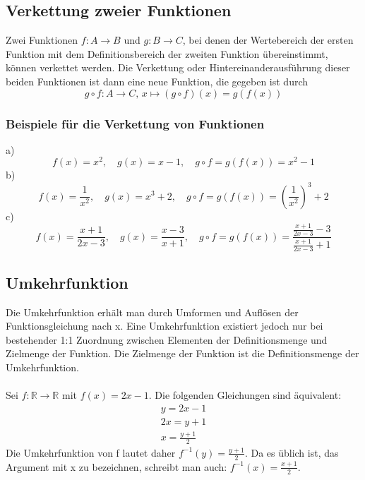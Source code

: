 \documentclass[a4paper]{article}
\begin{document}
\subsection{Verkettung zweier Funktionen}
Zwei Funktionen $f \colon A \to B$ und $g \colon B \to C$, bei denen der Wertebereich der ersten Funktion mit dem Definitionsbereich der zweiten Funktion übereinstimmt, können verkettet werden. Die Verkettung oder Hintereinanderausführung dieser beiden Funktionen ist dann eine neue Funktion, die gegeben ist durch
\[ g \circ f \colon A \to C, \, x \mapsto (g \circ f)(x) = g(f(x)) \]
\subsubsection{Beispiele für die Verkettung von Funktionen}
a)\[f(x)=x^2, \quad g(x)=x-1,\quad g\circ f=g(f(x))=x^2-1 \]
b)\[f(x)=\frac{1}{x^2}, \quad g(x)=x^3+2,\quad g\circ f=g(f(x))={\left(\frac{1}{x^2}\right)}^3+2 \]
c)\[f(x)=\frac{x+1}{2x-3}, \quad g(x)=\frac{x-3}{x+1}, \quad g\circ f=g(f(x))=\frac{\frac{x+1}{2x-3}-3}{\frac{x+1}{2x-3}+1} \]

\subsection{Umkehrfunktion}
Die Umkehrfunktion erhält man durch Umformen und Auflösen der Funktionsgleichung nach x. Eine Umkehrfunktion existiert jedoch nur bei bestehender 1:1 Zuordnung zwischen Elementen der Definitionsmenge und  Zielmenge der Funktion. Die Zielmenge der Funktion ist die Definitionsmenge der Umkehrfunktion. \\\\
Sei $f: \mathbb{R} \to \mathbb{R}$ mit $f(x) = 2x - 1$. Die folgenden Gleichungen sind äquivalent:
\begin{align*} 
y = 2x - 1 \\
2x = y + 1 \\
x = \frac{y+1}{2} 
\end{align*}
Die Umkehrfunktion von f lautet daher $f^{-1}(y)=\frac{y+1}{2}$. Da es üblich ist, das Argument mit x zu bezeichnen, schreibt man auch: $f^{-1}(x)=\frac{x+1}{2}$. 
\end{document}
